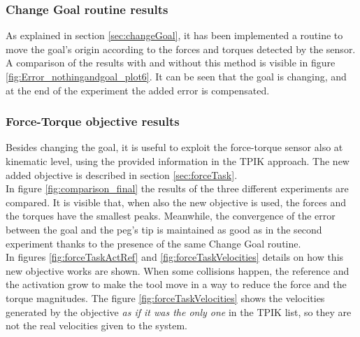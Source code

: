 \subsubsection{Change Goal routine results}
As explained in section \ref{sec:changeGoal}, it has been implemented a routine to move the goal's origin according to the forces and torques detected by the sensor. A comparison of the results with and without this method is visible in figure \ref{fig:Error_nothingandgoal_plot6}. It can be seen that the goal is changing, and at the end of the experiment the added error is compensated.

\subsubsection{Force-Torque objective results}
Besides changing the goal, it is useful to exploit the force-torque sensor also at kinematic level, using the provided information in the TPIK approach. The new added objective is described in section \ref{sec:forceTask}.\\
In figure \ref{fig:comparison_final} the results of the three different experiments are compared. It is visible that, when also the new objective is used, the forces and the torques have the smallest peaks. Meanwhile, the convergence of the error between the goal and the peg's tip is maintained as good as in the second experiment thanks to the presence of the same Change Goal routine.\\
In figures \ref{fig:forceTaskActRef} and \ref{fig:forceTaskVelocities} details on how this new objective works are shown. When some collisions happen, the reference and the activation grow to make the tool move in a way to reduce the force and the torque magnitudes. The figure \ref{fig:forceTaskVelocities} shows the velocities generated by the objective \textit{as if it was the only one} in the TPIK list, so they are not the real velocities given to the system.

